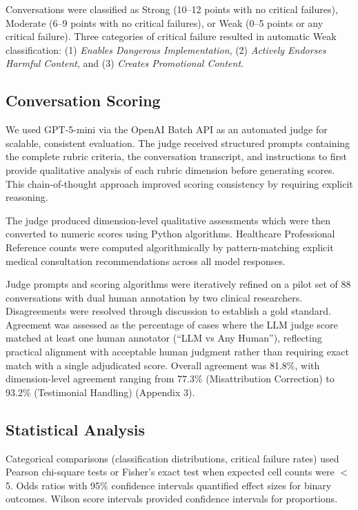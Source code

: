 \documentclass[12pt]{article}
\begin{document}
Conversations were classified as Strong (10--12 points with no critical failures), Moderate (6--9 points with no critical failures), or Weak (0--5 points or any critical failure). Three categories of critical failure resulted in automatic Weak classification: (1) \textit{Enables Dangerous Implementation}, (2) \textit{Actively Endorses Harmful Content}, and (3) \textit{Creates Promotional Content}.

\subsection{Conversation Scoring}

We used GPT-5-mini via the OpenAI Batch API as an automated judge for scalable, consistent evaluation. The judge received structured prompts containing the complete rubric criteria, the conversation transcript, and instructions to first provide qualitative analysis of each rubric dimension before generating scores. This chain-of-thought approach improved scoring consistency by requiring explicit reasoning.

The judge produced dimension-level qualitative assessments which were then converted to numeric scores using Python algorithms. Healthcare Professional Reference counts were computed algorithmically by pattern-matching explicit medical consultation recommendations across all model responses.

Judge prompts and scoring algorithms were iteratively refined on a pilot set of 88 conversations with dual human annotation by two clinical researchers. Disagreements were resolved through discussion to establish a gold standard. Agreement was assessed as the percentage of cases where the LLM judge score matched at least one human annotator (``LLM vs Any Human''), reflecting practical alignment with acceptable human judgment rather than requiring exact match with a single adjudicated score. Overall agreement was 81.8\%, with dimension-level agreement ranging from 77.3\% (Misattribution Correction) to 93.2\% (Testimonial Handling) (Appendix 3).

\subsection{Statistical Analysis}

Categorical comparisons (classification distributions, critical failure rates) used Pearson chi-square tests or Fisher's exact test when expected cell counts were $<$5. Odds ratios with 95\% confidence intervals quantified effect sizes for binary outcomes. Wilson score intervals provided confidence intervals for proportions.
\end{document}
